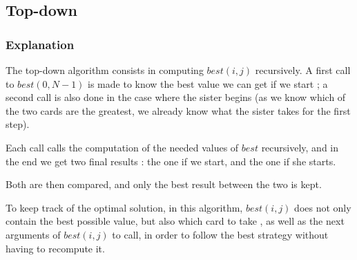 \documentclass[11pt]{article}
\begin{document}
\subsection{Top-down}
\subsubsection{Explanation}
The top-down algorithm consists in computing $best(i, j)$ recursively.
A first call to $best(0, N-1)$ is made to know the best value we can get
if we start ; a second call is also done in the case where the sister begins
(as we know which of the two cards are the greatest, we already know what the
sister takes for the first step).

Each call calls the computation of the needed values of $best$ recursively, and
in the end we get two final results : the one if we start,
and the one if she starts.

Both are then compared, and only the best result between the two is kept.

To keep track of the optimal solution, in this algorithm, $best(i, j)$ does not
only contain the best possible value, but also which card to take
, as well as the next arguments of $best(i, j)$ to call, 
in order to follow the best strategy without having to recompute it.
\end{document}
